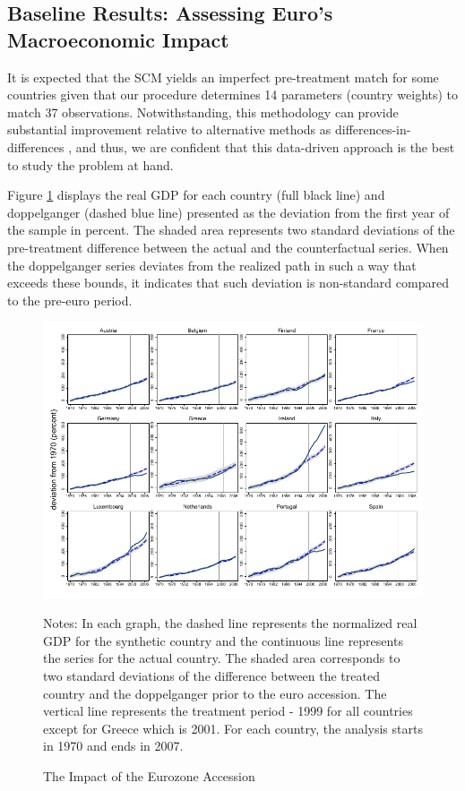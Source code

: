 \documentclass[12pt]{article}
\newcommand{\annote}[1]{\parbox{\textwidth}{\renewcommand{\baselinestretch}{1.0}\vspace{12pt} \small Notes: #1}}
\begin{document}
\subsection{Baseline Results: Assessing Euro's Macroeconomic Impact}

It is expected that the SCM yields an imperfect pre-treatment match for some countries given that our procedure determines 14 parameters (country weights) to match 37 observations. Notwithstanding, this methodology can provide substantial improvement relative to alternative methods as differences-in-differences \citep{Ferman2019}, and thus, we are confident that this data-driven approach is the best to study the problem at hand.

Figure \ref{F_1} displays the real GDP for each country (full black line) and doppelganger (dashed blue line) presented as the deviation from the first year of the sample in percent. The shaded area represents two standard deviations of the pre-treatment difference between the actual and the counterfactual series. When the doppelganger series deviates from the realized path in such a way that exceeds these bounds, it indicates that such deviation is non-standard compared to the pre-euro period.


\begin{figure}[h!]
    \centering
    \caption{The Impact of the Eurozone Accession}
    \label{F_1}
    \includegraphics[scale=1.15]{SCM_gdp_Annual.pdf}
    \annote{In each graph, the dashed line represents the normalized real GDP for the synthetic country and the continuous line represents the series for the actual country. The shaded area corresponds to two standard deviations of the difference between the treated country and the doppelganger prior to the euro accession. The vertical line represents the treatment period - 1999 for all countries except for Greece which is 2001. For each country, the analysis starts in 1970 and ends in 2007.
    }
\end{figure}
\end{document}
